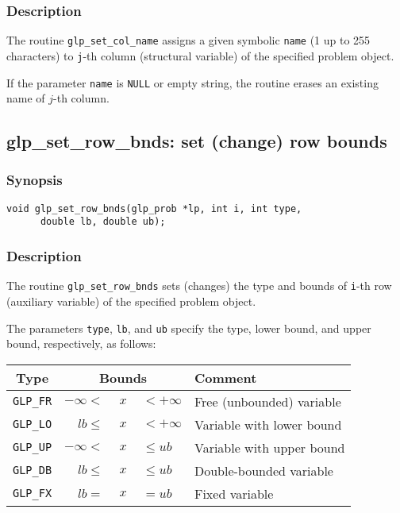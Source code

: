 \subsubsection*{Description}

The routine \verb|glp_set_col_name| assigns a given symbolic
\verb|name| (1 up to 255 characters) to \verb|j|-th column (structural
variable) of the specified problem object.

If the parameter \verb|name| is \verb|NULL| or empty string, the routine
erases an existing name of $j$-th column.

\subsection{glp\_set\_row\_bnds: set (change) row bounds}

\subsubsection*{Synopsis}

\begin{verbatim}
void glp_set_row_bnds(glp_prob *lp, int i, int type,
      double lb, double ub);
\end{verbatim}

\subsubsection*{Description}

The routine \verb|glp_set_row_bnds| sets (changes) the type and bounds
of \verb|i|-th row (auxiliary variable) of the specified problem object.

The parameters \verb|type|, \verb|lb|, and \verb|ub| specify the type,
lower bound, and upper bound, respectively, as follows:

\begin{center}
\begin{tabular}{cr@{}c@{}ll}
Type & \multicolumn{3}{c}{Bounds} & Comment \\
\hline
\verb|GLP_FR| & $-\infty <$ &$\ x\ $& $< +\infty$
   & Free (unbounded) variable \\
\verb|GLP_LO| & $lb \leq$ &$\ x\ $& $< +\infty$
   & Variable with lower bound \\
\verb|GLP_UP| & $-\infty <$ &$\ x\ $& $\leq ub$
   & Variable with upper bound \\
\verb|GLP_DB| & $lb \leq$ &$\ x\ $& $\leq ub$
   & Double-bounded variable \\
\verb|GLP_FX| & $lb =$ &$\ x\ $& $= ub$
   & Fixed variable \\
\end{tabular}
\end{center}

